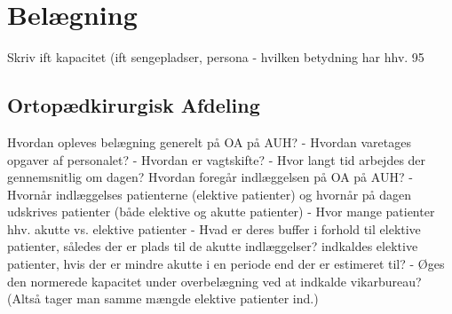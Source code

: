 \section{Belægning}
Skriv ift kapacitet (ift sengepladser, persona - hvilken betydning har hhv. 95 %


\subsection{Ortopædkirurgisk Afdeling}
Hvordan opleves belægning generelt på OA på AUH?
- Hvordan varetages opgaver af personalet? 
- Hvordan er vagtskifte?
- Hvor langt tid arbejdes der gennemsnitlig om dagen?
Hvordan foregår indlæggelsen på OA på AUH?
- Hvornår indlæggelses patienterne (elektive patienter) og hvornår på dagen udskrives patienter (både elektive og akutte patienter)
- Hvor mange patienter hhv. akutte vs. elektive patienter 
- Hvad er deres buffer i forhold til elektive patienter, således der er plads til de akutte indlæggelser? indkaldes elektive patienter, hvis der er mindre akutte i en periode end der er estimeret til?
- Øges den normerede kapacitet under overbelægning ved at indkalde vikarbureau? (Altså tager man samme mængde elektive patienter ind.) 
